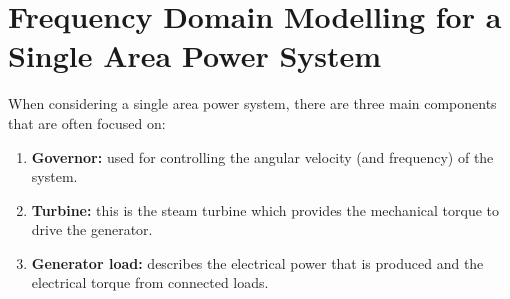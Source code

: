 \chapter{Frequency Domain Modelling for a Single Area Power System}
When considering a single area power system, there are three main components that are often focused on:
\begin{enumerate}
	\item \textbf{Governor:} used for controlling the angular velocity (and frequency) of the system.
	\item \textbf{Turbine:} this is the steam turbine which provides the mechanical torque to drive the generator.
	\item \textbf{Generator load:} describes the electrical power that is produced and the electrical torque from connected loads. 
\end{enumerate}





